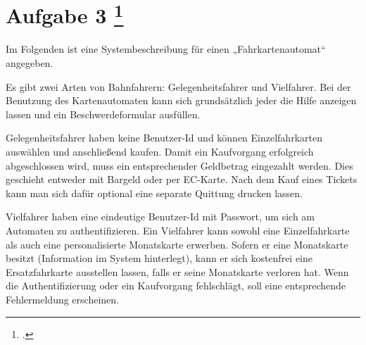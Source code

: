 \documentclass{lehramt-informatik-aufgabe}
\begin{document}
\section{Aufgabe 3
\footcite{examen:66116:2020:09}}

Im Folgenden ist eine Systembeschreibung für einen „Fahrkartenautomat“
angegeben.

Es gibt zwei Arten von Bahnfahrern: Gelegenheitsfahrer und Vielfahrer.
Bei der Benutzung des Kartenautomaten kann sich grundsätzlich jeder die
Hilfe anzeigen lassen und ein Beschwerdeformular ausfüllen.

Gelegenheitsfahrer haben keine Benutzer-Id und können Einzelfahrkarten
auswählen und anschließend kaufen. Damit ein Kaufvorgang erfolgreich
abgeschlossen wird, muss ein entsprechender Geldbetrag eingezahlt
werden. Dies geschieht entweder mit Bargeld oder per EC-Karte. Nach dem
Kauf eines Tickets kann man sich dafür optional eine separate Quittung
drucken lassen.

Vielfahrer haben eine eindeutige Benutzer-Id mit Passwort, um sich am
Automaten zu authentifizieren. Ein Vielfahrer kann sowohl eine
Einzelfahrkarte als auch eine personalisierte Monatskarte erwerben.
Sofern er eine Monatskarte besitzt (Information im System hinterlegt),
kann er sich kostenfrei eine Ersatzfahrkarte ausstellen lassen, falls er
seine Monatskarte verloren hat. Wenn die Authentifizierung oder ein
Kaufvorgang fehlschlägt, soll eine entsprechende Fehlermeldung
erscheinen.
\end{document}
